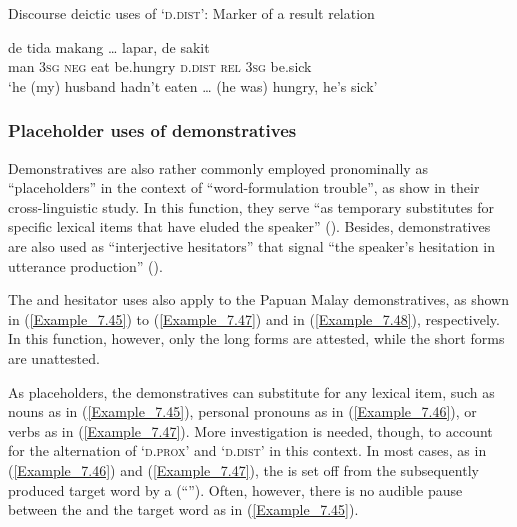 {\begin{styleExampleTitle}
Discourse deictic uses of  ‘\textsc{d.dist}’: Marker of a result relation
\end{styleExampleTitle}

\ea
\label{Example_7.44}
 {de} {tida} {makang} {\ldots} {lapar,} {} {} {de} {sakit}\\ %
 man  \textsc{3sg}  \textsc{neg}  eat  { }   be.hungry  \textsc{d.dist}  \textsc{rel}  \textsc{3sg}  be.sick\\
\glt
‘he (my) husband hadn’t eaten {\ldots} (he was) hungry,  he’s sick’ \textstyleExampleSource{[080921-004b-CvNP.0003/0007]}
\z


\subsubsection[Placeholder uses of demonstratives]{Placeholder uses of demonstratives}
\label{Para_7.1.2.6}
Demonstratives are also rather commonly employed pronominally as “placeholders” in the context of “word-formulation trouble”, as \citet{Hayashi.2006} show in their cross-linguistic study. In this function, they serve “as temporary substitutes for specific lexical items that have eluded the speaker” (\citeyear*[499]{Hayashi.2006}). Besides, demonstratives are also used as “interjective hesitators” that signal “the speaker’s hesitation in utterance production” (\citeyear*[512–513]{Hayashi.2006}). \citep[See also][36.]{Dooley.2001}



The  and hesitator uses also apply to the Papuan Malay demonstratives, as shown in (\ref{Example_7.45}) to (\ref{Example_7.47}) and in (\ref{Example_7.48}), respectively. In this function, however, only the long  forms are attested, while the short forms are unattested.



As placeholders, the demonstratives can substitute for any lexical item, such as nouns as in (\ref{Example_7.45}), personal pronouns as in (\ref{Example_7.46}), or verbs as in (\ref{Example_7.47}). More investigation is needed, though, to account for the alternation of  ‘\textsc{d.prox}’ and  ‘\textsc{d.dist}’ in this context. In most cases, as in (\ref{Example_7.46}) and (\ref{Example_7.47}), the  is set off from the subsequently produced target word by a  (``{\textbar}''). Often, however, there is no audible pause between the  and the target word as in (\ref{Example_7.45}).



}
